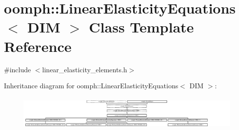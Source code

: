 \hypertarget{classoomph_1_1LinearElasticityEquations}{}\section{oomph\+:\+:Linear\+Elasticity\+Equations$<$ D\+IM $>$ Class Template Reference}
\label{classoomph_1_1LinearElasticityEquations}


{\ttfamily \#include $<$linear\+\_\+elasticity\+\_\+elements.\+h$>$}

Inheritance diagram for oomph\+:\+:Linear\+Elasticity\+Equations$<$ D\+IM $>$\+:\begin{figure}[H]
\begin{center}
\leavevmode
\includegraphics[height=1.736434cm]{classoomph_1_1LinearElasticityEquations}
\end{center}
\end{figure}

